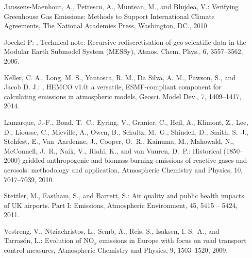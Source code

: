 \documentclass[12pt,a4paper]{article} %
\begin{document}
\begin{thebibliography}{}


Janssens-Maenhout, A., Petrescu, A., Muntean, M., and Blujdea, V.: Verifying
  Greenhouse Gas Emissions: Methods to Support International Climate
  Agreements, The National Academies Press, Washington, DC., 2010.

Joeckel P: , Technical note: Recursive rediscretisation of geo-scientific data in the Modular Earth Submodel System (MESSy), Atmos. Chem. Phys., 6, 3557--3562, 2006.

Keller, C. A., Long, M. S., Yantosca, R. M., Da Silva, A. M., Pawson, S., and Jacob D. J.: , HEMCO v1.0: a versatile, ESMF-compliant component for calculating emissions in atmospheric models, Geosci. Model Dev., 7, 1409--1417, 2014.

Lamarque, J.-F., Bond, T.~C., Eyring, V., Granier, C., Heil, A., Klimont, Z.,
  Lee, D., Liousse, C., Mieville, A., Owen, B., Schultz, M.~G., Shindell, D.,
  Smith, S.~J., Stehfest, E., Van~Aardenne, J., Cooper, O.~R., Kainuma, M.,
  Mahowald, N., McConnell, J.~R., Naik, V., Riahi, K., and van Vuuren, D.~P.:
  Historical (1850--2000) gridded anthropogenic and biomass burning emissions
  of reactive gases and aerosols: methodology and application, Atmospheric
  Chemistry and Physics, 10, 7017--7039, 2010.

Stettler, M., Eastham, S., and Barrett, S.: Air quality and public health
  impacts of UK airports. Part I: Emissions, Atmospheric Environment, 45,
  5415 -- 5424, 2011.

Vestreng, V., Ntziachristos, L., Semb, A., Reis, S., Isaksen, I. S.~A., and
  Tarras\'on, L.: Evolution of NO$_{x}$ emissions in Europe with focus on road
  transport control measures, Atmospheric Chemistry and Physics, 9, 1503--1520, 2009.


\end{thebibliography}
\end{document}
